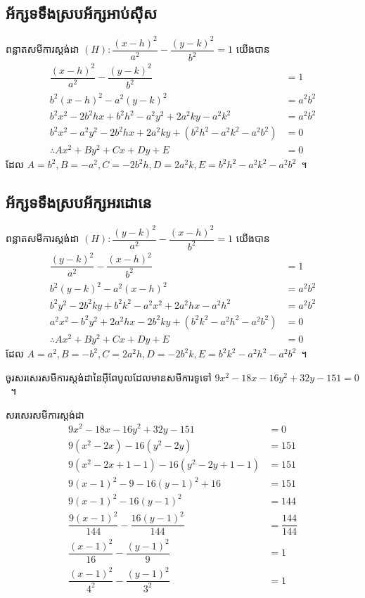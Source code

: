 \subsection{អ័ក្សទទឹងស្របអ័ក្សអាប់ស៊ីស}
%
ពន្លាតសមីការស្តង់ដា $ (H):\dfrac{(x-h)^2}{a^2}-\dfrac{(y-k)^2}{b^2}=1 $ យើងបាន
\begin{align*}
	\dfrac{(x-h)^2}{a^2}-\dfrac{(y-k)^2}{b^2} &=1\\
	b^2(x-h)^2-a^2(y-k)^2 &=a^2b^2\\
	b^2x^2-2b^2hx+b^2h^2-a^2y^2+2a^2ky-a^2k^2 &=a^2b^2\\
	b^2x^2-a^2y^2-2b^2hx+2a^2ky+(b^2h^2-a^2k^2-a^2b^2) &=0\\
	\therefore Ax^2+By^2+Cx+Dy+E &=0
\end{align*}
ដែល $ A=b^2,B=-a^2,C=-2b^2h,D=2a^2k,E=b^2h^2-a^2k^2-a^2b^2 $~។
%
\subsection{អ័ក្សទទឹងស្របអ័ក្សអរដោនេ}
%
ពន្លាតសមីការស្តង់ដា $ (H):\dfrac{(y-k)^2}{a^2}-\dfrac{(x-h)^2}{b^2}=1 $ យើងបាន
\begin{align*}
\dfrac{(y-k)^2}{a^2}-\dfrac{(x-h)^2}{b^2} &=1\\
b^2(y-k)^2-a^2(x-h)^2 &=a^2b^2\\
b^2y^2-2b^2ky+b^2k^2-a^2x^2+2a^2hx-a^2h^2 &=a^2b^2\\
a^2x^2-b^2y^2+2a^2hx-2b^2ky+(b^2k^2-a^2h^2-a^2b^2) &=0\\
\therefore Ax^2+By^2+Cx+Dy+E &=0
\end{align*}
ដែល $ A=a^2,B=-b^2,C=2a^2h,D=-2b^2k,E=b^2k^2-a^2h^2-a^2b^2 $~។
%
\begin{example*}
	ចូរសរសេរសមីការស្តង់ដានៃអ៊ីពែបូលដែលមានសមីការទូទៅ $ 9 x^2-18 x-16 y^2+32 y-151=0 $~។
\end{example*}
%
\begin{answer}
	សរសេរសមីការស្ដង់ដា
	\begin{align*}
		9 x^2-18 x-16 y^2+32 y-151 &=0\\
		9(x^2-2x)-16(y^2-2y) &=151\\
		9(x^2-2x+1-1)-16(y^2-2y+1-1) &=151\\
		9(x-1)^2-9-16(y-1)^2+16 &=151\\
		9(x-1)^2-16(y-1)^2 &=144\\
		\dfrac{9(x-1)^2}{144}-\dfrac{16(y-1)^2}{144} &=\dfrac{144}{144}\\
		\dfrac{(x-1)^2}{16}-\dfrac{(y-1)^2}{9} &=1\\
		\dfrac{(x-1)^2}{4^2}-\dfrac{(y-1)^2}{3^2} &=1
	\end{align*}
\end{answer}
